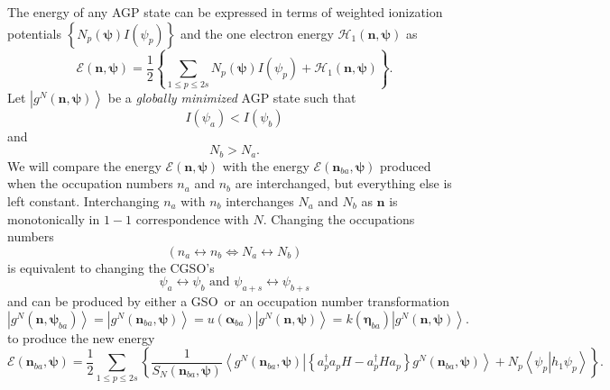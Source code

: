 \documentclass[aps,preprint]{revtex4}%
\begin{document}
The energy of any AGP state can be expressed in terms of weighted ionization
potentials $\left\{  N_{p}\left(  \mathbf{\psi}\right)  I\left(  \psi
_{p}\right)  \right\}  $ and the one electron energy $\mathcal{H}_{1}\left(
\mathbf{n},\mathbf{\psi}\right)  $ as
\begin{equation}
\mathcal{E}\left(  \mathbf{n},\mathbf{\psi}\right)  =\frac{1}{2}\left\{
\sum_{1\leq p\leq2s}N_{p}\left(  \mathbf{\psi}\right)  I\left(  \psi
_{p}\right)  +\mathcal{H}_{1}\left(  \mathbf{n},\mathbf{\psi}\right)
\right\}  .
\end{equation}
Let $\left\vert g^{N}\left(  \mathbf{n},\mathbf{\psi}\right)  \right\rangle $
be a \emph{globally minimized }AGP state such that \emph{\ }
\begin{equation}
I\left(  \psi_{a}\right)  <I\left(  \psi_{b}\right)
\end{equation}
and
\begin{equation}
N_{b}>N_{a}.
\end{equation}
We will compare the energy $\mathcal{E}\left(  \mathbf{n},\mathbf{\psi
}\right)  $ with the energy $\mathcal{E}\left(  \mathbf{n}_{ba},\mathbf{\psi
}\right)  $ produced when the occupation numbers $n_{a}$ and $n_{b}$ are
interchanged, but everything else is left constant. Interchanging $n_{a}$ with
$n_{b}$ interchanges $N_{a}$ and $N_{b}$ as $\mathbf{n}$ is monotonically in
$1-1$ correspondence with $N$. Changing the occupations numbers
\begin{equation}
\left(  n_{a}\leftrightarrow n_{b}\Leftrightarrow N_{a}\leftrightarrow
N_{b}\right)
\end{equation}
is equivalent to changing the CGSO's
\begin{equation}
\psi_{a}\leftrightarrow\psi_{b}\text{ and }\psi_{a+s}\leftrightarrow\psi_{b+s}%
\end{equation}
and can be produced by either a GSO\ or an occupation number transformation
\begin{equation}
\left\vert g^{N}\left(  \mathbf{n},\mathbf{\psi}_{ba}\right)  \right\rangle
=\left\vert g^{N}\left(  \mathbf{n}_{ba},\mathbf{\psi}\right)  \right\rangle
=u\left(  \mathbf{\alpha}_{ba}\right)  \left\vert g^{N}\left(  \mathbf{n}%
,\mathbf{\psi}\right)  \right\rangle =k\left(  \mathbf{\eta}_{ba}\right)
\left\vert g^{N}\left(  \mathbf{n},\mathbf{\psi}\right)  \right\rangle .
\end{equation}
to produce the new energy
\begin{equation}
\mathcal{E}\left(  \mathbf{n}_{ba},\mathbf{\psi}\right)  =\frac{1}{2}%
{\textstyle\sum\limits_{1\leq p\leq2s}}
\left\{  \frac{1}{S_{N}\left(  \mathbf{n}_{ba},\mathbf{\psi}\right)
}\left\langle \left.  g^{N}\left(  \mathbf{n}_{ba},\mathbf{\psi}\right)
\right\vert \left\{  a_{p}^{\dagger}a_{p}H-a_{p}^{\dagger}Ha_{p}\right\}
g^{N}\left(  \mathbf{n}_{ba},\mathbf{\psi}\right)  \right\rangle
+N_{p}\left\langle \left.  \psi_{p}\right\vert h_{1}\psi_{p}\right\rangle
\right\}  . \label{enba}%
\end{equation}
\end{document}
